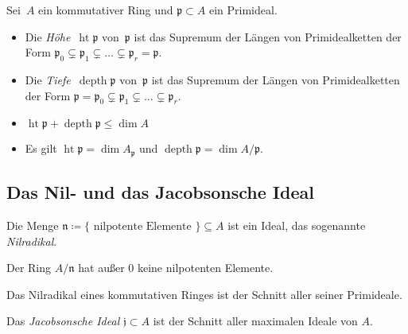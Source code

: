 \documentclass{cheat-sheet}
\DeclareMathOperator{\height}{ht} %
\DeclareMathOperator{\depth}{depth} %
\newcommand{\jjj}{\mathfrak{j}}
\newcommand{\ppp}{\mathfrak{p}}
\newcommand{\nnn}{\mathfrak{n}}
\begin{document}

\begin{defn}
  Sei~$A$ ein kommutativer Ring und $\ppp \subset A$ ein Primideal.
  \begin{itemize}
    \item Die \emph{Höhe}~$\height \ppp$ von~$\ppp$ ist das Supremum der Längen von Primidealketten der Form
    $\ppp_0 \subsetneq \ppp_1 \subsetneq \ldots \subsetneq \ppp_r = \ppp$.
    \item Die \emph{Tiefe}~$\depth \ppp$ von~$\ppp$ ist das Supremum der Längen von Primidealketten der Form
    $\ppp = \ppp_0 \subsetneq \ppp_1 \subsetneq \ldots \subsetneq \ppp_r$.
  \end{itemize}
\end{defn}

\begin{bemn}
  \begin{itemize}
    \item $\height \ppp + \depth \ppp \leq \dim A$
    \item Es gilt \enspace
    $\height \ppp = \dim A_\ppp$
    \enspace und \enspace
    $\depth \ppp = \dim A/\ppp$.
  \end{itemize}
\end{bemn}

\subsection{Das Nil- und das Jacobsonsche Ideal}


\begin{lemdefn}
  Die Menge $\nnn \coloneqq \{ \text{ nilpotente Elemente } \} \subseteq A$ ist ein Ideal, das sogenannte \emph{Nilradikal}.
\end{lemdefn}

\begin{bem}
  Der Ring $A/\nnn$ hat außer $0$ keine nilpotenten Elemente.
\end{bem}

\begin{prop}
  Das Nilradikal eines kommutativen Ringes ist der Schnitt aller seiner Primideale.
\end{prop}


\begin{defn}
  Das \emph{Jacobsonsche Ideal} $\jjj \subset A$ ist der Schnitt aller maximalen Ideale von $A$.
\end{defn}
\end{document}
